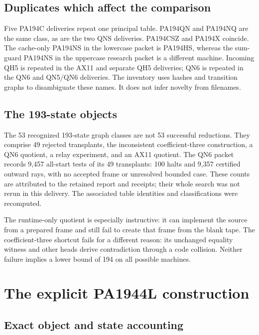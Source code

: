 \documentclass[10pt,letterpaper]{article}
\begin{document}
\subsection{Duplicates which affect the comparison}

Five PA194C deliveries repeat one principal table. PA194QN and PA194NQ
are the same class, as are the two QNS deliveries. PA194CSZ and PA194X
coincide. The cache-only PA194NS in the lowercase packet is PA194HS,
whereas the sum-guard PA194NS in the uppercase research packet is a
different machine. Incoming QH5 is repeated in the AX11 and separate
QH5 deliveries; QN6 is repeated in the QN6 and QN5/QN6 deliveries.
The inventory uses hashes and transition graphs to disambiguate these
names. It does not infer novelty from filenames.

\subsection{The 193-state objects}

The 53 recognized 193-state graph classes are not 53 successful
reductions. They comprise 49 rejected transplants, the inconsistent
coefficient-three construction, a QN6 quotient, a relay experiment, and
an AX11 quotient. The QN6 packet records 9,457 all-start tests of its 49
transplants: 100 halts and 9,357 certified outward rays, with no accepted
frame or unresolved bounded case. These counts are attributed to the
retained report and receipts; their whole search was not rerun in this
delivery. The associated table identities and classifications were
recomputed.

The runtime-only quotient is especially instructive: it can implement
the source from a prepared frame and still fail to create that frame
from the blank tape. The coefficient-three shortcut fails for a
different reason: its unchanged equality witness and other heads
derive contradiction through a code collision. Neither failure implies
a lower bound of 194 on all possible machines.

\section{The explicit PA1944L construction}
\label{sec:construction}

\subsection{Exact object and state accounting}
\end{document}
